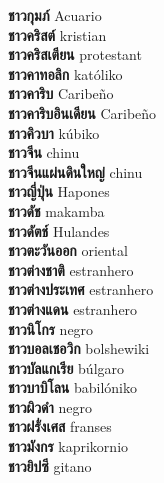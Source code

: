 \textbf{ ชาวกุมภ์  } Acuario \\
\textbf{ ชาวคริสต์  } kristian \\
\textbf{ ชาวคริสเตียน  } protestant \\
\textbf{ ชาวคาทอลิก  } katóliko \\
\textbf{ ชาวคาริบ  } Caribeño \\
\textbf{ ชาวคาริบอินเดียน  } Caribeño \\
\textbf{ ชาวคิวบา  } kúbiko \\
\textbf{ ชาวจีน  } chinu \\
\textbf{ ชาวจีนแผ่นดินใหญ่  } chinu \\
\textbf{ ชาวญี่ปุ่น  } Hapones \\
\textbf{ ชาวดัช  } makamba \\
\textbf{ ชาวดัตช์  } Hulandes \\
\textbf{ ชาวตะวันออก  } oriental \\
\textbf{ ชาวต่างชาติ  } estranhero \\
\textbf{ ชาวต่างประเทศ  } estranhero \\
\textbf{ ชาวต่างแดน  } estranhero \\
\textbf{ ชาวนิโกร  } negro \\
\textbf{ ชาวบอลเชอวิก  } bolshewiki \\
\textbf{ ชาวบัลแกเรีย  } búlgaro \\
\textbf{ ชาวบาบิโลน  } babilóniko \\
\textbf{ ชาวผิวดำ  } negro \\
\textbf{ ชาวฝรั่งเศส  } franses \\
\textbf{ ชาวมังกร  } kaprikornio \\
\textbf{ ชาวยิปซี  } gitano \\
